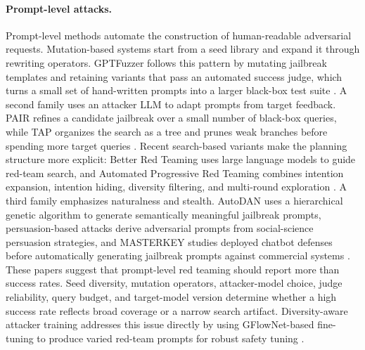 \paragraph{Prompt-level attacks.}
Prompt-level methods automate the construction of human-readable adversarial requests. Mutation-based systems start from a seed library and expand it through rewriting operators. GPTFuzzer follows this pattern by mutating jailbreak templates and retaining variants that pass an automated success judge, which turns a small set of hand-written prompts into a larger black-box test suite \cite{yu2023gptfuzzer}. A second family uses an attacker LLM to adapt prompts from target feedback. PAIR refines a candidate jailbreak over a small number of black-box queries, while TAP organizes the search as a tree and prunes weak branches before spending more target queries \cite{chao2023jailbreaking,mehrotra2023tree}. Recent search-based variants make the planning structure more explicit: Better Red Teaming uses large language models to guide red-team search, and Automated Progressive Red Teaming combines intention expansion, intention hiding, diversity filtering, and multi-round exploration \cite{chen-etal-2025-better,jiang-etal-2025-automated}. A third family emphasizes naturalness and stealth. AutoDAN uses a hierarchical genetic algorithm to generate semantically meaningful jailbreak prompts, persuasion-based attacks derive adversarial prompts from social-science persuasion strategies, and MASTERKEY studies deployed chatbot defenses before automatically generating jailbreak prompts against commercial systems \cite{liu2023autodan,zeng-etal-2024-johnny,deng2024masterkey}. These papers suggest that prompt-level red teaming should report more than success rates. Seed diversity, mutation operators, attacker-model choice, judge reliability, query budget, and target-model version determine whether a high success rate reflects broad coverage or a narrow search artifact. Diversity-aware attacker training addresses this issue directly by using GFlowNet-based fine-tuning to produce varied red-team prompts for robust safety tuning \cite{lee2024learning}.

